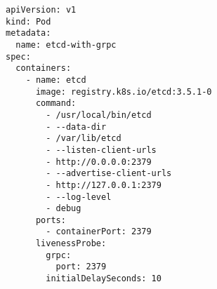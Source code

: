\begin{verbatim}
apiVersion: v1
kind: Pod
metadata:
  name: etcd-with-grpc
spec:
  containers:
    - name: etcd
      image: registry.k8s.io/etcd:3.5.1-0
      command:
        - /usr/local/bin/etcd
        - --data-dir
        - /var/lib/etcd
        - --listen-client-urls
        - http://0.0.0.0:2379
        - --advertise-client-urls
        - http://127.0.0.1:2379
        - --log-level
        - debug
      ports:
        - containerPort: 2379
      livenessProbe:
        grpc:
          port: 2379
        initialDelaySeconds: 10
\end{verbatim}